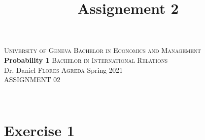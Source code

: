 \documentclass[12pt,thmsa]{article}\usepackage[]{graphicx}\usepackage[]{color}
\title{Assignement 2}
\begin{document}
\noindent \textsc{University of Geneva}     \hfill \textsc{Bachelor in Economics and Management} \\
\textbf{Probability 1}                      \hfill \textsc{Bachelor in International Relations} \\
Dr. Daniel \textsc{Flores Agreda}                 \hfill Spring 2021  \\
ASSIGNMENT 02                               \hfill



\noindent
\makebox[\linewidth]{\rule{\textwidth}{0.4pt}}\\[1.5ex]





\section*{Exercise 1}
\end{document}
